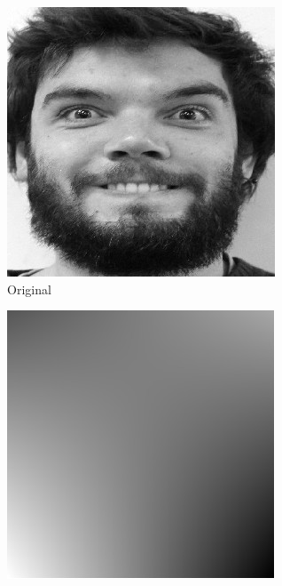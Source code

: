 \documentclass[12pt,a4paper,titlepage]{article}
\begin{document}
\begin{figure}[H]
	\centering
	\begin{subfigure}{0.3\columnwidth}
		\centering
		\includegraphics[width=\textwidth]{lightCorrection1.jpg}
		\caption{Original}
	\end{subfigure}
	\quad
	\begin{subfigure}{0.3\textwidth}
		\centering
		\includegraphics[width=\textwidth]{lightCorrection2.jpg}

\end{subfigure}
\end{figure}
\end{document}
